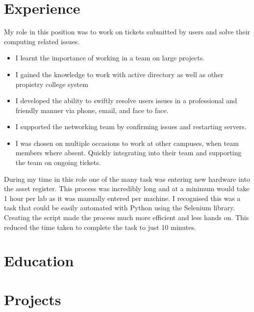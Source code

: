 \documentclass[a4paper]{cv}
\begin{document}
\hspace{0.2cm}
\begin{minipage}[t]{0.66\textwidth}
\section{Experience}
My role in this position was to work on tickets submitted by users and solve their computing related issues.
\begin{itemize}
    \item I learnt the importance of working in a team on large projects.
    \item I gained the knowledge to work with active directory as well as other propietry college system
    \item I developed the ability to swiftly resolve users issues in a professional and friendly manner via phone, email, and face to face.
    \item I supported the networking team by confirming issues and restarting servers.
    \item I was chosen on multiple occasions to work at other campuses, when team members where absent. Quickly integrating into their team and supporting the team on ongoing tickets.
\end{itemize}
During my time in this role one of the many task was entering new hardware into the asset register. This process was incredibly long and at a minimum would take 1 hour per lab as it was manually entered per machine. I recognised this was a task that could be easily automated with Python using the Selenium library. Creating the script made the process much more efficient and less hands on. This reduced the time taken to complete the task to just 10 minutes.
\section{Education}
\sectionspace

\sectionspace

 
\section{Projects}

\end{minipage}
\end{document}
